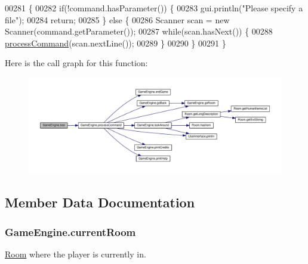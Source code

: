 \begin{DoxyCode}
00281                                              \{
00282         \textcolor{keywordflow}{if}(!command.hasParameter()) \{
00283             gui.println(\textcolor{stringliteral}{"Please specify a file"});
00284             \textcolor{keywordflow}{return};
00285         \} \textcolor{keywordflow}{else} \{
00286             Scanner scan = \textcolor{keyword}{new} Scanner(command.getParameter());
00287             \textcolor{keywordflow}{while}(scan.hasNext()) \{
00288                 \hyperlink{classGameEngine_ad7133885f313fa99bca3bb7cb8272f64}{processCommand}(scan.nextLine());
00289             \}
00290         \}
00291     \}
\end{DoxyCode}


Here is the call graph for this function\-:
\nopagebreak
\begin{figure}[H]
\begin{center}
\leavevmode
\includegraphics[width=350pt]{classGameEngine_a0cfc6fc69e60ffe8a436d04de0938349_cgraph}
\end{center}
\end{figure}




\subsection{Member Data Documentation}
\hypertarget{classGameEngine_aa08e7cbb458047a2f72ff594d2e230bc}{
\subsubsection[{current\-Room}]{ Game\-Engine.\-current\-Room\hspace{0.3cm}{\ttfamily [private]}}}\label{classGameEngine_aa08e7cbb458047a2f72ff594d2e230bc}
\hyperlink{classRoom}{Room} where the player is currently in. 

